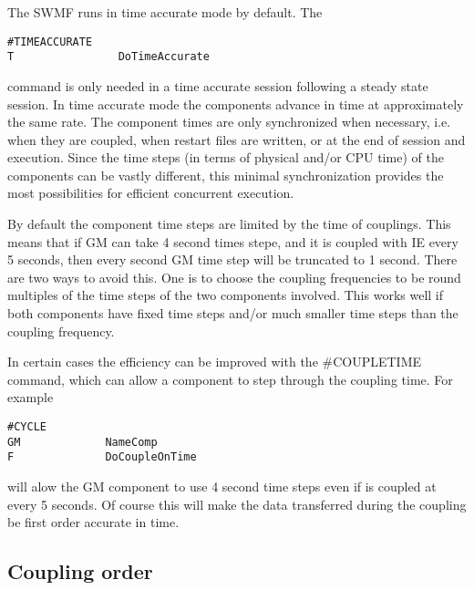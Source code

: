 The SWMF runs in time accurate mode by default. The
\begin{verbatim}
#TIMEACCURATE
T                DoTimeAccurate
\end{verbatim}
command is only needed in a time accurate session following a 
steady state session.
In time accurate mode the components advance in time at
approximately the same rate. The component times are
only synchronized when necessary, i.e. when they
are coupled, when restart files are written, or 
at the end of session and execution. Since the time
steps (in terms of physical and/or CPU time) of the components can be 
vastly different, this minimal synchronization provides the 
most possibilities for efficient concurrent execution.

By default the component time steps are limited by the
time of couplings. This means that if GM can take 4 second
times stepe, and it is coupled with IE every 5 seconds,
then every second GM time step will be truncated to 1 second.
There are two ways to avoid this. One is to choose the
coupling frequencies to be round multiples of the time steps
of the two components involved. This works well if both components
have fixed time steps and/or much smaller time steps than the 
coupling frequency.

In certain cases the efficiency can be improved with the
\#COUPLETIME command, which can allow a component to 
step through the coupling time. For example
\begin{verbatim}
#CYCLE
GM             NameComp
F              DoCoupleOnTime
\end{verbatim}
will alow the GM component to use 4 second time steps even
if is coupled at every 5 seconds. Of course this will
make the data transferred during the coupling be 
first order accurate in time.

\subsection{Coupling order}

